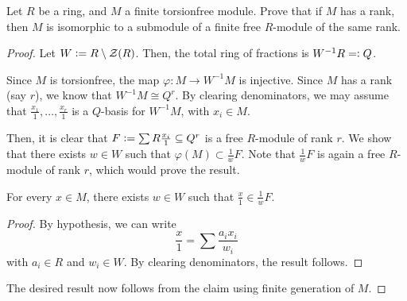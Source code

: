 \documentclass[12pt]{article}
\begin{document}
\begin{exe}
	Let $R$ be a ring, and $M$ a finite torsionfree module. Prove that if $M$ has a rank, then $M$ is isomorphic to a submodule of a finite free $R$-module of the same rank.
\end{exe}
\begin{proof} 
	Let $W \vcentcolon= R \setminus \mathcal{Z}(R)$. Then, the total ring of fractions is $W^{-1}R =\vcentcolon Q$.

	Since $M$ is torsionfree, the map $\varphi : M \to W^{-1} M$ is injective. Since $M$ has a rank (say $r$), we know that $W^{-1} M \cong Q^{r}$. \newline
	By clearing denominators, we may assume that $\frac{x_{1}}{1}, \ldots, \frac{x_{r}}{1}$ is a $Q$-basis for $W^{-1} M$, with $x_{i} \in M$. 

	Then, it is clear that $F \vcentcolon= \sum R \frac{x_{i}}{1} \subset Q^{r}$ is a free $R$-module of rank $r$. We show that there exists $w \in W$ such that $\varphi(M) \subset \frac{1}{w} F$. Note that $\frac{1}{w} F$ is again a free $R$-module of rank $r$, which would prove the result.

	\claim{} For every $x \in M$, there exists $w \in W$ such that $\frac{x}{1} \in \frac{1}{w} F$.
	\begin{proof} 
		By hypothesis, we can write
		\begin{equation*} 
			\frac{x}{1} = \sum \frac{a_{i} x_{i}}{w_{i}}
		\end{equation*}
		with $a_{i} \in R$ and $w_{i} \in W$. By clearing denominators, the result follows.
	\end{proof}

	The desired result now follows from the claim using finite generation of $M$.
\end{proof}
\end{document}
